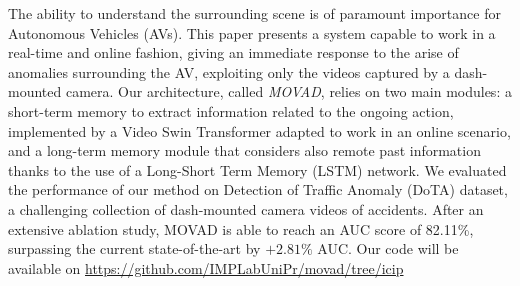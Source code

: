 The ability to understand the surrounding scene is of paramount importance for Autonomous Vehicles (AVs).
This paper presents a system capable to work in a real-time and online fashion, giving an immediate response to the arise of anomalies surrounding the AV, exploiting only the videos captured by a dash-mounted camera.
Our architecture, called \emph{MOVAD}, relies on two main modules: a short-term memory to extract information related to the ongoing action, implemented by a Video Swin Transformer adapted to work in an online scenario, and a long-term memory module that considers also remote past information thanks to the use of a Long-Short Term Memory (LSTM) network.
We evaluated the performance of our method on Detection of Traffic Anomaly (DoTA) dataset, a challenging collection of dash-mounted camera videos of accidents.
After an extensive ablation study, MOVAD is able to reach an AUC score of 82.11\%, surpassing the current state-of-the-art by $+2.81\%$ AUC.
Our code will be available on {\footnotesize \url{https://github.com/IMPLabUniPr/movad/tree/icip}}
